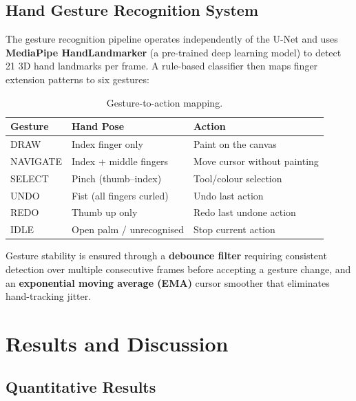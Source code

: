 \documentclass[12pt, a4paper]{article}
\begin{document}
\subsection{Hand Gesture Recognition System}

The gesture recognition pipeline operates independently of the U-Net and uses \textbf{MediaPipe HandLandmarker} (a pre-trained deep learning model) to detect 21 3D hand landmarks per frame.
A rule-based classifier then maps finger extension patterns to six gestures:

\begin{table}[H]
    \centering
    \caption{Gesture-to-action mapping.}
    \label{tab:gestures}
    \begin{tabular}{lll}
        \toprule
        \textbf{Gesture} & \textbf{Hand Pose} & \textbf{Action} \\
        \midrule
        DRAW     & Index finger only      & Paint on the canvas \\
        NAVIGATE & Index + middle fingers  & Move cursor without painting \\
        SELECT   & Pinch (thumb--index)    & Tool/colour selection \\
        UNDO     & Fist (all fingers curled) & Undo last action \\
        REDO     & Thumb up only           & Redo last undone action \\
        IDLE     & Open palm / unrecognised & Stop current action \\
        \bottomrule
    \end{tabular}
\end{table}

Gesture stability is ensured through a \textbf{debounce filter} requiring consistent detection over multiple consecutive frames before accepting a gesture change, and an \textbf{exponential moving average (EMA)} cursor smoother that eliminates hand-tracking jitter.

\section{Results and Discussion}

\subsection{Quantitative Results}
\end{document}
